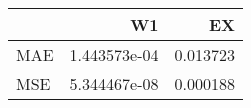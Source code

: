 \begin{tabular}{lrr}
\toprule
{} &            W1 &        EX \\
\midrule
MAE &  1.443573e-04 &  0.013723 \\
MSE &  5.344467e-08 &  0.000188 \\
\bottomrule
\end{tabular}
